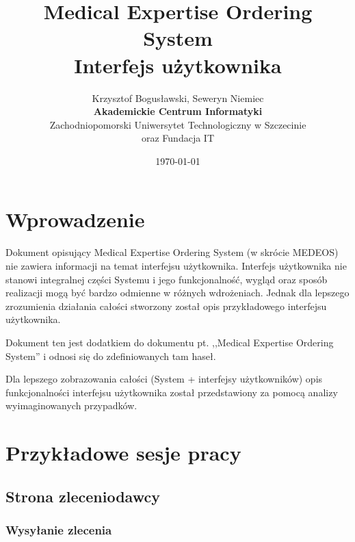 \documentclass[a4paper]{article}
\begin{document}
\title{Medical Expertise Ordering System \\Interfejs użytkownika}
\author{Krzysztof Bogusławski, Seweryn Niemiec\\ 
\textbf{Akademickie Centrum Informatyki} \\ 
Zachodniopomorski Uniwersytet Technologiczny w Szczecinie\\
oraz Fundacja IT}
\date{\today}
\maketitle
\tableofcontents

\section{Wprowadzenie}

Dokument opisujący Medical Expertise Ordering System (w skrócie MEDEOS) nie zawiera
informacji na temat interfejsu użytkownika. Interfejs użytkownika nie stanowi integralnej części
Systemu i jego funkcjonalność, wygląd oraz sposób realizacji mogą być bardzo odmienne w
różnych wdrożeniach. Jednak dla lepszego zrozumienia działania całości stworzony został
opis przykładowego interfejsu użytkownika.

Dokument ten jest dodatkiem do dokumentu pt. ,,Medical Expertise Ordering System'' i odnosi się
do zdefiniowanych tam haseł. 

Dla lepszego zobrazowania całości (System + interfejsy użytkowników) opis
funkcjonalności interfejsu użytkownika został przedstawiony za pomocą analizy
wyimaginowanych przypadków.

\section{Przykładowe sesje pracy}

\subsection{Strona zleceniodawcy}

\subsubsection{Wysyłanie zlecenia}
\end{document}
